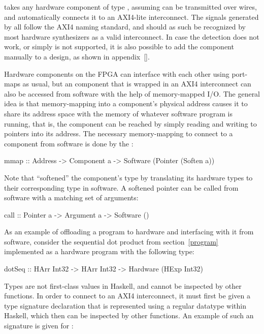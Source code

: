 \documentclass[../paper.tex]{subfiles}
\begin{document}
 takes any hardware component of type , assuming  can be transmitted over wires, and automatically connects it to an AXI4-lite interconnect. The signals generated by  all follow the AXI4 naming standard, and should as such be recognized by most hardware synthesizers as a valid interconnect. In case the detection does not work, or simply is not supported, it is also possible to add the component manually to a design, as shown in appendix~\ref{}.

Hardware components on the FPGA can interface with each other using port-maps as usual, but an component that is wrapped in an AXI4 interconnect can also be accessed from software with the help of memory-mapped I/O. The general idea is that memory-mapping into a component's physical address causes it to share its address space with the memory of whatever software program is running, that is, the component can be reached by simply reading and writing to pointers into its address. The necessary memory-mapping to connect to a component from software is done by the :

\begin{code}
mmap :: Address -> Component a -> Software (Pointer (Soften a))
\end{code}

\noindent Note that  ``softened'' the component's type by translating its hardware types to their corresponding type in software. A softened pointer can be called from software with a matching set of arguments:

\begin{code}
call :: Pointer a -> Argument a -> Software ()
\end{code}

As an example of offloading a program to hardware and interfacing with it from software, consider the sequential dot product from section~\ref{program} implemented as a hardware program with the following type:

\begin{code}
dotSeq :: HArr Int32 -> HArr Int32 -> Hardware (HExp Int32)
\end{code}

\noindent Types are not first-class values in Haskell, and cannot be inspected by other functions. In order to connect  to an AXI4 interconnect, it must first be given a type signature declaration that is represented using a regular datatype within Haskell, which then can be inspected by other functions. An example of such an signature is given for :
\end{document}
